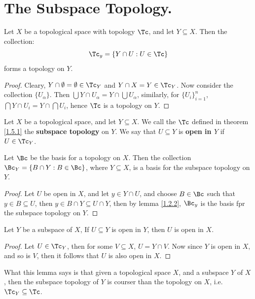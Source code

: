 
\section{The Subspace Topology.}

\begin{theorem}\label{1.5.1}
    Let $X$ be a topological space with topology $\Tc$, and let $Y \subseteq X$. Then the
    collection:
        \begin{equation*}
            \Tc_y = \{Y \cap U: U \in \Tc\}
        \end{equation*}
    forms a topology on $Y$.
\end{theorem}
\begin{proof}
    Cleary, $Y \cap \emptyset=\emptyset \in \Tc_Y$ and  $Y \cap X=Y \in \Tc_Y$. Now  consider the collection
    $\{U_{\alpha}\}$. Then  $\bigcup{Y \cap U_{\alpha}}=Y \cap \bigcup{U_{\alpha}}$, similarly, for  $\{U_i\}_{i=1}^n$,
    $\bigcap{Y \cap U_i}=Y \cap \bigcap{U_i}$, hence  $\Tc$ is a topology on  $Y$.
\end{proof}

\begin{definition}
    Let $X$ be a topological space, and let  $Y \subseteq X$. We call the $\Tc$ defined
    in theorem \ref{1.5.1} the \textbf{subspace topology} on $Y$. We say that $U \subseteq Y$ is
    \textbf{open in $Y$} if $U \in \Tc_Y$.
\end{definition}

\begin{lemma}\label{1.5.2}
    Let $\Bc$ be the basis for a topology on  $X$. Then the collection  $\Bc_Y=\{B \cap Y: B \in \Bc\}$,
    where  $Y \subseteq X$, is a basis for the subspace topology on  $Y$.
\end{lemma}
\begin{proof}
    Let $U$ be open in  $X$, and let  $y \in Y \cap U$, and choose  $B \in \Bc$ such that
    $y \in B \subseteq U$, then  $y \in B \cap Y \subseteq U \cap Y$, then by lemma \ref{1.2.2},
     $\Bc_y$ is the basis fpr the subspace topology on  $Y$.
\end{proof}

\begin{lemma}\label{1.5.3}
    Let $Y$ be a subspace of  $X$, If  $U \subseteq Y$ is open in  $Y$, then  $U$ is
    open in  $X$.
\end{lemma}
\begin{proof}
    Let $U \in \Tc_Y$, then for some  $V \subseteq X$,  $U=Y \cap V$. Now since  $Y$ is open in  $X$, and so
    is  $V$, then  it follows that $U$ is also open in  $X$.
\end{proof}
\begin{remark}
    What this lemma says is that given a topological space $X$, and a subspace  $Y$ of  $X$, then the
    subspace topology of  $Y$ is courser than the topology on  $X$, i.e.  $\Tc_Y \subseteq \Tc$.
\end{remark}

